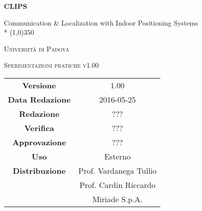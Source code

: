 \documentclass[a4paper,12pt]{article}
\author{}
\date{9/12/2015}
\begin{document}
	\begin{titlepage}
		\centering
		{\huge\bfseries CLIPS\par}
	Communication \& Localization with Indoor Positioning Systems \\*
	\line(1,0){350} \\
	{\scshape\LARGE Università di Padova \par}
	\vspace{1cm}
	{\scshape\Large Sperimentazioni pratiche v1.00\par}
	\logo
	\newpage
		\begin{tabular}{c|c}
			{\hfill \textbf{Versione}} 		& 1.00				\\
			{\hfill\textbf{Data Redazione}} 	& 2016-05-25	  		\\
			{\hfill\textbf{Redazione}}		& ??? 		\\
			{\hfill\textbf{Verifica}} 		& ???		\\
			{\hfill\textbf{Approvazione}} 		& ???		\\
			{\hfill\textbf{Uso}} 			& Esterno			\\
			{\hfill\textbf{Distribuzione}} 		& Prof. Vardanega Tullio 	\\
								& Prof. Cardin Riccardo 	\\
								& Miriade S.p.A. 		\\
		\end{tabular}
	\end{titlepage}
	\newpage
		\pagestyle{myfront}
		

	\newpage
		\tableofcontents
	\newpage
		\listoftables
	\newpage
		\listoffigures
	\label{LastFrontPage}

	\newpage
	\pagestyle{mymain}
				
		
	\newpage
		
		
	\newpage
		
		
	\newpage
				
		
	\newpage
		
		
	
		
		
	\label{LastPage}
\end{document}
